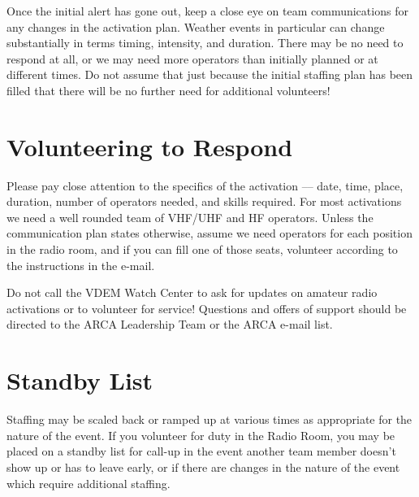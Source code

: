 \documentclass[pdflatex,letterpaper,twoside,12pt]{book}
\begin{document}
Once the initial alert has gone out, keep a close eye on team communications for any changes in the activation plan.  Weather events in particular can change substantially in terms timing, intensity, and duration.  There may be no need to respond at all, or we may need more operators than initially planned or at different times.  Do not assume that just because the initial staffing plan has been filled that there will be no further need for additional volunteers!


\section{Volunteering to Respond}

Please pay close attention to the specifics of the activation –-- date, time, place, duration, number of operators needed, and skills required.  For most activations we need a well rounded team of VHF/UHF and HF operators.  Unless the communication plan states otherwise, assume we need operators for each position in the radio room, and if you can fill one of those seats, volunteer according to the instructions in the e-mail.

Do not call the VDEM Watch Center to ask for updates on amateur radio activations or to volunteer for service!  Questions and offers of support should be directed to the ARCA Leadership Team or the ARCA e-mail list.


\section{Standby List}

Staffing may be scaled back or ramped up at various times as appropriate for the nature of the event.  If you volunteer for duty in the Radio Room, you may be placed on a standby list for call-up in the event another team member doesn't show up or has to leave early, or if there are changes in the nature of the event which require additional staffing.

\end{document}
